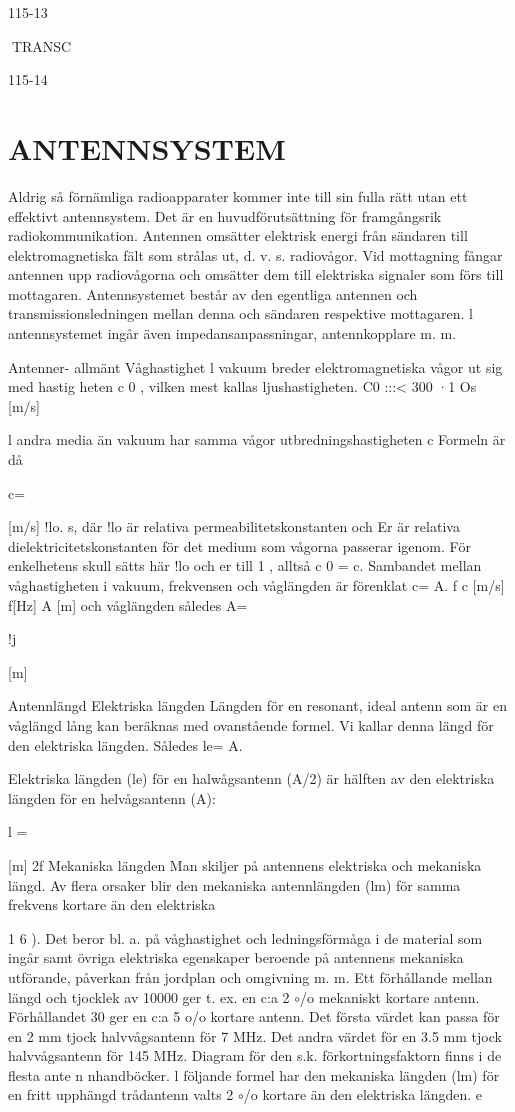 \documentclass[a4paper,twoside,twocolumn,openright]{book}
\begin{document}
{{{115-13

TRANSC

115-14


\chapter{ANTENNSYSTEM}

Aldrig så förnämliga radioapparater kommer inte till sin fulla rätt utan ett effektivt
antennsystem. Det är en huvudförutsättning för framgångsrik radiokommunikation.
Antennen omsätter elektrisk energi från
sändaren till elektromagnetiska fält som strålas ut, d. v. s. radiovågor.
Vid mottagning fångar antennen upp
radiovågorna och omsätter dem till elektriska signaler som förs till mottagaren.
Antennsystemet består av den egentliga
antennen och transmissionsledningen mellan denna och sändaren respektive mottagaren. l antennsystemet ingår även impedansanpassningar, antennkopplare m. m.

Antenner- allmänt
Våghastighet
l vakuum breder elektromagnetiska vågor
ut sig med hastig heten c 0 , vilken mest kallas
ljushastigheten.
C0 :::< 300 ·1 Os [m/s]

l andra media än vakuum har samma
vågor utbredningshastigheten c
Formeln är då

c=~

[m/s]
!lo. s,
där !lo är relativa permeabilitetskonstanten
och Er är relativa dielektricitetskonstanten för
det medium som vågorna passerar igenom.
För enkelhetens skull sätts här !lo och er till
1 , alltså c 0 = c.
Sambandet mellan våghastigheten i vakuum, frekvensen och våglängden är förenklat
c= A. f
c [m/s] f[Hz] A [m]
och våglängden således A=

!j

[m]

Antennlängd
Elektriska längden
Längden för en resonant, ideal antenn som
är en våglängd lång kan beräknas med
ovanstående formel. Vi kallar denna längd
för den elektriska längden. Således le= A.

Elektriska längden (le) för en halwågsantenn (A/2) är hälften av den elektriska
längden för en helvågsantenn (A):

l =~

[m]
2f
Mekaniska längden
Man skiljer på antennens elektriska och
mekaniska längd. Av flera orsaker blir den
mekaniska antennlängden (lm) för samma
frekvens kortare än den elektriska {1 6 ). Det
beror bl. a. på våghastighet och ledningsförmåga i de material som ingår samt övriga
elektriska egenskaper beroende på antennens mekaniska utförande, påverkan från
jordplan och omgivning m. m.
Ett förhållande mellan längd och tjocklek
av 10000 ger t. ex. en c:a 2 $\circ$/o mekaniskt
kortare antenn. Förhållandet 30 ger en c:a 5
o/o kortare antenn. Det första värdet kan
passa för en 2 mm tjock halvvågsantenn för
7 MHz. Det andra värdet för en 3.5 mm tjock
halvvågsantenn för 145 MHz. Diagram för
den s.k. förkortningsfaktorn finns i de flesta
ante n nhandböcker.
l följande formel har den mekaniska längden (lm) för en fritt upphängd trådantenn
valts 2 $\circ$/o kortare än den elektriska längden.
e

}}}}
\end{document}

